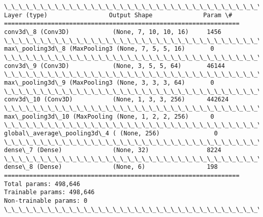 \documentclass[11pt]{article}
\begin{document}
    \begin{Verbatim}[commandchars=\\\{\}]
\_\_\_\_\_\_\_\_\_\_\_\_\_\_\_\_\_\_\_\_\_\_\_\_\_\_\_\_\_\_\_\_\_\_\_\_\_\_\_\_\_\_\_\_\_\_\_\_\_\_\_\_\_\_\_\_\_\_\_\_\_\_\_\_\_
Layer (type)                 Output Shape              Param \#   
=================================================================
conv3d\_8 (Conv3D)            (None, 7, 10, 10, 16)     1456      
\_\_\_\_\_\_\_\_\_\_\_\_\_\_\_\_\_\_\_\_\_\_\_\_\_\_\_\_\_\_\_\_\_\_\_\_\_\_\_\_\_\_\_\_\_\_\_\_\_\_\_\_\_\_\_\_\_\_\_\_\_\_\_\_\_
max\_pooling3d\_8 (MaxPooling3 (None, 7, 5, 5, 16)       0         
\_\_\_\_\_\_\_\_\_\_\_\_\_\_\_\_\_\_\_\_\_\_\_\_\_\_\_\_\_\_\_\_\_\_\_\_\_\_\_\_\_\_\_\_\_\_\_\_\_\_\_\_\_\_\_\_\_\_\_\_\_\_\_\_\_
conv3d\_9 (Conv3D)            (None, 3, 5, 5, 64)       46144     
\_\_\_\_\_\_\_\_\_\_\_\_\_\_\_\_\_\_\_\_\_\_\_\_\_\_\_\_\_\_\_\_\_\_\_\_\_\_\_\_\_\_\_\_\_\_\_\_\_\_\_\_\_\_\_\_\_\_\_\_\_\_\_\_\_
max\_pooling3d\_9 (MaxPooling3 (None, 3, 3, 3, 64)       0         
\_\_\_\_\_\_\_\_\_\_\_\_\_\_\_\_\_\_\_\_\_\_\_\_\_\_\_\_\_\_\_\_\_\_\_\_\_\_\_\_\_\_\_\_\_\_\_\_\_\_\_\_\_\_\_\_\_\_\_\_\_\_\_\_\_
conv3d\_10 (Conv3D)           (None, 1, 3, 3, 256)      442624    
\_\_\_\_\_\_\_\_\_\_\_\_\_\_\_\_\_\_\_\_\_\_\_\_\_\_\_\_\_\_\_\_\_\_\_\_\_\_\_\_\_\_\_\_\_\_\_\_\_\_\_\_\_\_\_\_\_\_\_\_\_\_\_\_\_
max\_pooling3d\_10 (MaxPooling (None, 1, 2, 2, 256)      0         
\_\_\_\_\_\_\_\_\_\_\_\_\_\_\_\_\_\_\_\_\_\_\_\_\_\_\_\_\_\_\_\_\_\_\_\_\_\_\_\_\_\_\_\_\_\_\_\_\_\_\_\_\_\_\_\_\_\_\_\_\_\_\_\_\_
global\_average\_pooling3d\_4 ( (None, 256)               0         
\_\_\_\_\_\_\_\_\_\_\_\_\_\_\_\_\_\_\_\_\_\_\_\_\_\_\_\_\_\_\_\_\_\_\_\_\_\_\_\_\_\_\_\_\_\_\_\_\_\_\_\_\_\_\_\_\_\_\_\_\_\_\_\_\_
dense\_7 (Dense)              (None, 32)                8224      
\_\_\_\_\_\_\_\_\_\_\_\_\_\_\_\_\_\_\_\_\_\_\_\_\_\_\_\_\_\_\_\_\_\_\_\_\_\_\_\_\_\_\_\_\_\_\_\_\_\_\_\_\_\_\_\_\_\_\_\_\_\_\_\_\_
dense\_8 (Dense)              (None, 6)                 198       
=================================================================
Total params: 498,646
Trainable params: 498,646
Non-trainable params: 0
\_\_\_\_\_\_\_\_\_\_\_\_\_\_\_\_\_\_\_\_\_\_\_\_\_\_\_\_\_\_\_\_\_\_\_\_\_\_\_\_\_\_\_\_\_\_\_\_\_\_\_\_\_\_\_\_\_\_\_\_\_\_\_\_\_

    \end{Verbatim}
\end{document}
